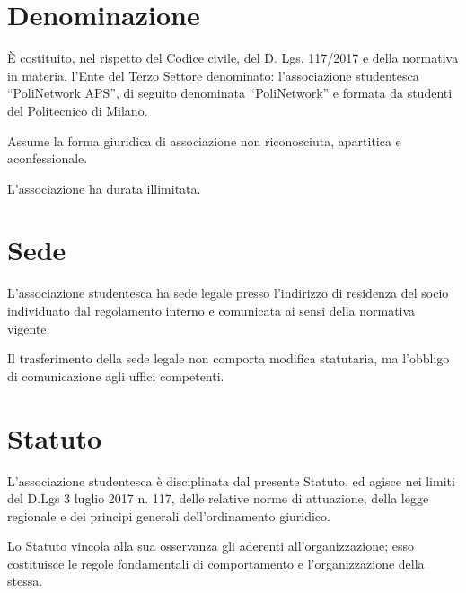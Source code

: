 \documentclass[legalpaper, 11pt]{exam}
\let\tempone\enumerate
\let\temptwo\endenumerate
\renewenvironment{enumerate}{\tempone\addtolength{\itemsep}{-0.45\baselineskip}}{\temptwo}
\begin{document}



\begin{center}

\end{center}




\section{Denominazione}
\begin{enumerate}
 \item È costituito, nel rispetto del Codice civile, del D. Lgs. 117/2017 e della normativa in materia, l’Ente del Terzo Settore denominato: l’associazione studentesca “PoliNetwork APS”, di seguito denominata “PoliNetwork” e formata da studenti del Politecnico di Milano.
 \item Assume la forma giuridica di associazione non riconosciuta, apartitica e aconfessionale.
 \item L'associazione ha durata illimitata.
\end{enumerate}

\section{Sede}
\begin{enumerate}
 \item L’associazione studentesca ha sede legale presso l’indirizzo di residenza del socio individuato dal regolamento interno e comunicata ai sensi della normativa vigente.
\item Il trasferimento della sede legale non comporta modifica statutaria, ma l’obbligo di comunicazione agli uffici competenti.
\end{enumerate}

\section{Statuto}
\begin{enumerate}
 \item L’associazione studentesca è disciplinata dal presente Statuto, ed agisce nei limiti del D.Lgs 3 luglio 2017 n. 117, delle relative norme di attuazione, della legge regionale e dei principi generali dell’ordinamento giuridico.
 \item Lo Statuto vincola alla sua osservanza gli aderenti all’organizzazione; esso costituisce le regole fondamentali di comportamento e l’organizzazione della stessa.
\end{enumerate}
\end{document}
